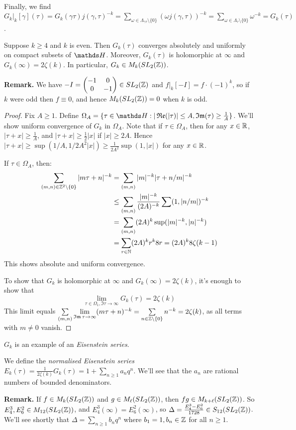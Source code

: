 \documentclass[10pt,a4paper]{article}
\begin{document}
Finally, we find $G_k|_k[\gamma](\tau) = G_k(\gamma\tau)j(\gamma,\tau)^{-k} = \sum\limits_{\omega \in \Lambda_{\gamma\tau}\setminus\{0\}}(\omega j(\gamma,\tau))^{-k} = \sum\limits_{\omega \in \Lambda_\tau\setminus\{0\}} \omega^{-k} = G_k(\tau)$.
\begin{proposition}
  Suppose $k \geq 4$ and $k$ is even. Then $G_k(\tau)$ converges absolutely and uniformly on compact subsets of $\H$. Moreover, $G_k(\tau)$ is holomorphic at $\infty$ and $G_k(\infty) = 2\zeta(k)$. In particular, $G_k \in M_k(SL_2(\mathbb{Z}))$.
\end{proposition}
\textbf{Remark.} We have $-I = \begin{pmatrix} -1&0\\0&-1 \end{pmatrix} \in SL_2(\mathbb{Z})$ and $f|_k[-I] = f\cdot(-1)^k$, so if $k$ were odd then $f \equiv 0$, and hence $M_k(SL_2(\mathbb{Z})) = 0$ when $k$ is odd.
\begin{proof}
  Fix $A \geq 1$. Define $\Omega_A = \{\tau \in \H : |\Re(|\tau)|\leq A, \Im(\tau) \geq \frac{1}{A}\}$. We'll show uniform convergence of $G_k$ in $\Omega_A$. Note that if $\tau \in \Omega_A$, then for any $x \in \mathbb{R}$, $|\tau+x| \geq \frac{1}{A}$, and $|\tau+x| \geq \frac{1}{2}|x|$ if $|x|\geq 2A$. Hence $|\tau+x| \geq \sup(1/A, 1/2A^2|x|) \geq \frac{1}{2A^2}\sup(1, |x|)$ for any $x \in \mathbb{R}$.

  If $\tau \in \Omega_A$, then:
  \begin{align*}
    \sum_{(m,n) \in \mathbb{Z}^2\setminus\{0\}} |m\tau+n|^{-k} &= \sum_{(m,n)} |m|^{-k}|\tau+n/m|^{-k} \\
    &\leq \sum_{(m,n)}\frac{|m|^{-k}}{(2A)^{-k}}\sum(1, |n/m|)^{-k}\\
    &= \sum_{(m,n)}(2A)^k \sup(|m|^{-k}, |n|^{-k})\\
    &= \sum_{r \in \mathbb{N}} (2A)^k r^k 8r = (2A)^k8\zeta(k-1)
  \end{align*}
  This shows absolute and uniform convergence.

  To show that $G_k$ is holomorphic at $\infty$ and $G_k(\infty) = 2\zeta(k)$, it's enough to show that
  \[\lim_{\tau\in\Omega_1, \Im\tau\to\infty} G_k(\tau) = 2\zeta(k)\]
  This limit equals $\sum\limits_{(m,n)}\lim\limits_{\operatorname{\mathfrak{Im}}\tau\to\infty}(m\tau+n)^{-k} = \sum\limits_{n\in \mathbb{Z}\setminus \{0\}}n^{-k} = 2\zeta(k)$, as all terms with $m \neq 0$ vanish.
\end{proof}
$G_k$ is an example of an \emph{Eisenstein series}.
\begin{definition}
  We define the \emph{normalised Eisenstein series} $E_k(\tau) = \frac{1}{2\zeta(k)}G_k(\tau) = 1 + \sum_{n\geq 1}a_nq^n$. We'll see that the $a_n$ are rational numbers of bounded denominators.
\end{definition}
\textbf{Remark.} If $f \in M_k(SL_2(\mathbb{Z}))$ and $g \in M_\ell(SL_2(\mathbb{Z}))$, then $fg \in M_{k+\ell}(SL_2(\mathbb{Z}))$. So $E_4^3, E_6^2 \in M_{12}(SL_2(\mathbb{Z}))$, and $E_4^3(\infty) = E_6^2(\infty)$, so $\Delta = \frac{E_4^3-E_6^2}{1728} \in S_{12}(SL_2(\mathbb{Z}))$. We'll see shortly that $\Delta = \sum_{n\geq 1} b_nq^n$ where $b_1 = 1, b_n \in \mathbb{Z}$ for all $n \geq 1$.
\end{document}
